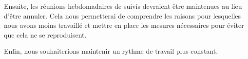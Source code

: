 \begin{spacing}{1.5}
    Ensuite, les réunions hebdomadaires de suivis devraient être maintenues au lieu d'être annuler. Cela nous permetterai de comprendre les raisons pour lesquelles nous avons moins travaillé et mettre en place les mesures nécessaires pour éviter que cela ne se reproduisent.
\end{spacing}

\begin{spacing}{1.5}
    Enfin, nous souhaiterions maintenir un rythme de travail plus constant.
\end{spacing}
